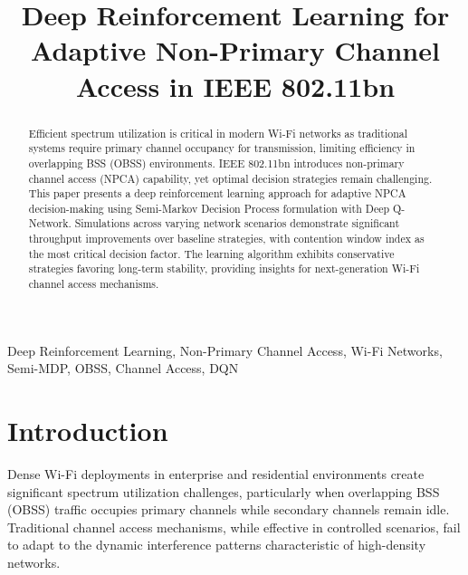 \documentclass[conference]{IEEEtran}
\begin{document}
\title{Deep Reinforcement Learning for Adaptive Non-Primary Channel Access in IEEE 802.11bn}

\author{
}

\maketitle

\begin{abstract}
Efficient spectrum utilization is critical in modern Wi-Fi networks as traditional systems require primary channel occupancy for transmission, limiting efficiency in overlapping BSS (OBSS) environments. IEEE 802.11bn introduces non-primary channel access (NPCA) capability, yet optimal decision strategies remain challenging. This paper presents a deep reinforcement learning approach for adaptive NPCA decision-making using Semi-Markov Decision Process formulation with Deep Q-Network. Simulations across varying network scenarios demonstrate significant throughput improvements over baseline strategies, with contention window index as the most critical decision factor. The learning algorithm exhibits conservative strategies favoring long-term stability, providing insights for next-generation Wi-Fi channel access mechanisms.
\end{abstract}

\begin{IEEEkeywords}
Deep Reinforcement Learning, Non-Primary Channel Access, Wi-Fi Networks, Semi-MDP, OBSS, Channel Access, DQN
\end{IEEEkeywords}

\section{Introduction}

Dense Wi-Fi deployments in enterprise and residential environments create significant spectrum utilization challenges, particularly when overlapping BSS (OBSS) traffic occupies primary channels while secondary channels remain idle. Traditional channel access mechanisms, while effective in controlled scenarios, fail to adapt to the dynamic interference patterns characteristic of high-density networks.
\end{document}
